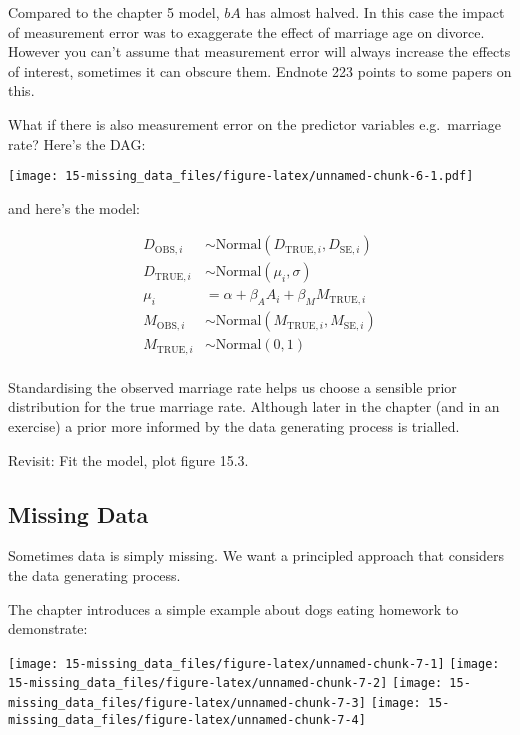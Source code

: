 \documentclass[
]{book}
\begin{document}
Compared to the chapter 5 model, \(bA\) has almost halved. In this case the impact of measurement error was to exaggerate the effect of marriage age on divorce. However you can't assume that measurement error will always increase the effects of interest, sometimes it can obscure them. Endnote 223 points to some papers on this.

What if there is also measurement error on the predictor variables e.g.~marriage rate? Here's the DAG:

\texttt{[image: 15-missing\_data\_files/figure-latex/unnamed-chunk-6-1.pdf]}

and here's the model:

\[
\begin{aligned}
D_{\text{OBS},i} &\sim \text{Normal}(D_{\text{TRUE},i},D_{\text{SE},i}) \\
D_{\text{TRUE},i} &\sim \text{Normal}(\mu_i,\sigma) \\
\mu_i &= \alpha + \beta_A A_i + \beta_M M_{\text{TRUE},i}\\
M_{\text{OBS},i} &\sim \text{Normal}(M_{\text{TRUE},i},M_{\text{SE},i}) \\
M_{\text{TRUE},i} &\sim \text{Normal}(0,1) \\
\end{aligned}
\]

Standardising the observed marriage rate helps us choose a sensible prior distribution for the true marriage rate. Although later in the chapter (and in an exercise) a prior more informed by the data generating process is trialled.

Revisit: Fit the model, plot figure 15.3.

\hypertarget{missing-data}{%
\subsection*{Missing Data}\label{missing-data}}

Sometimes data is simply missing. We want a principled approach that considers the data generating process.

The chapter introduces a simple example about dogs eating homework to demonstrate:

\texttt{[image: 15-missing\_data\_files/figure-latex/unnamed-chunk-7-1]} \texttt{[image: 15-missing\_data\_files/figure-latex/unnamed-chunk-7-2]} \texttt{[image: 15-missing\_data\_files/figure-latex/unnamed-chunk-7-3]} \texttt{[image: 15-missing\_data\_files/figure-latex/unnamed-chunk-7-4]}
\end{document}
